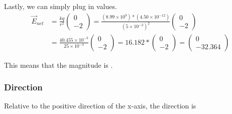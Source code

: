 \documentclass[12pt]{article}
\begin{document}
Lastly, we can simply plug in values.
\begin{align*}
    \vec{E}_{net}   &=  \frac{kq}{r^2}\begin{pmatrix} 0\\-2 \end{pmatrix}
        =   \frac{(8.99 \times 10^{9})*(4.50 \times 10^{-12})}{(5 \times 10^{-2})^2}\begin{pmatrix} 0\\-2 \end{pmatrix}\\
        &=  \frac{40.455 \times 10^{-3}}{25 \times 10^{-4}}\begin{pmatrix} 0\\-2 \end{pmatrix}
        =   16.182 * \begin{pmatrix} 0\\-2 \end{pmatrix} = \begin{pmatrix} 0\\-32.364 \end{pmatrix}
\end{align*}

This means that the magnitude is \boxed{32.364 \unit{\newton/\coulomb}}.

\subsubsection*{Direction}
Relative to the positive direction of the x-axis, the direction is 
\end{document}
